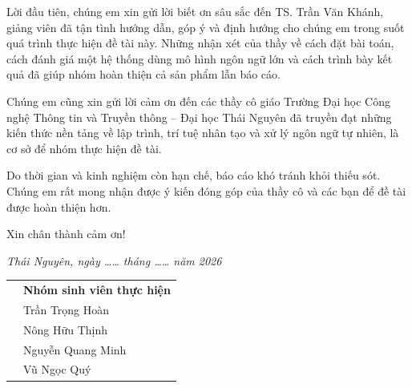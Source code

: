 
Lời đầu tiên, chúng em xin gửi lời biết ơn sâu sắc đến TS. Trần Văn Khánh, giảng viên đã tận tình hướng dẫn, góp ý và định hướng cho chúng em trong suốt quá trình thực hiện đề tài này. Những nhận xét của thầy về cách đặt bài toán, cách đánh giá một hệ thống dùng mô hình ngôn ngữ lớn và cách trình bày kết quả đã giúp nhóm hoàn thiện cả sản phẩm lẫn báo cáo.

Chúng em cũng xin gửi lời cảm ơn đến các thầy cô giáo Trường Đại học Công nghệ Thông tin và Truyền thông -- Đại học Thái Nguyên đã truyền đạt những kiến thức nền tảng về lập trình, trí tuệ nhân tạo và xử lý ngôn ngữ tự nhiên, là cơ sở để nhóm thực hiện đề tài.

Do thời gian và kinh nghiệm còn hạn chế, báo cáo khó tránh khỏi thiếu sót. Chúng em rất mong nhận được ý kiến đóng góp của thầy cô và các bạn để đề tài được hoàn thiện hơn.

Xin chân thành cảm ơn!

\vspace{6pt}
\begin{flushright}
\textit{Thái Nguyên, ngày …… tháng …… năm 2026}
\end{flushright}

\noindent
\begin{tabular}{@{}p{}>{\centering\arraybackslash}p{}@{}}
 & \textbf{Nhóm sinh viên thực hiện} \\[2.2cm]
 & Trần Trọng Hoàn \\
 & Nông Hữu Thịnh \\
 & Nguyễn Quang Minh \\
 & Vũ Ngọc Quý \\
\end{tabular}
